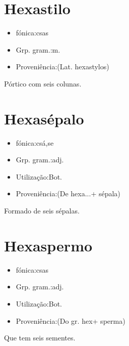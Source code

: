 \documentclass{article}
\begin{document}
\section{Hexastilo}
\begin{itemize}
\item {fónica:csas}
\end{itemize}
\begin{itemize}
\item {Grp. gram.:m.}
\end{itemize}
\begin{itemize}
\item {Proveniência:(Lat. \textunderscore hexastylos\textunderscore )}
\end{itemize}
Pórtico com seis colunas.
\section{Hexasépalo}
\begin{itemize}
\item {fónica:csá,se}
\end{itemize}
\begin{itemize}
\item {Grp. gram.:adj.}
\end{itemize}
\begin{itemize}
\item {Utilização:Bot.}
\end{itemize}
\begin{itemize}
\item {Proveniência:(De \textunderscore hexa...\textunderscore  + \textunderscore sépala\textunderscore )}
\end{itemize}
Formado de seis sépalas.
\section{Hexaspermo}
\begin{itemize}
\item {fónica:csas}
\end{itemize}
\begin{itemize}
\item {Grp. gram.:adj.}
\end{itemize}
\begin{itemize}
\item {Utilização:Bot.}
\end{itemize}
\begin{itemize}
\item {Proveniência:(Do gr. \textunderscore hex\textunderscore  + \textunderscore sperma\textunderscore )}
\end{itemize}
Que tem seis sementes.
\end{document}
